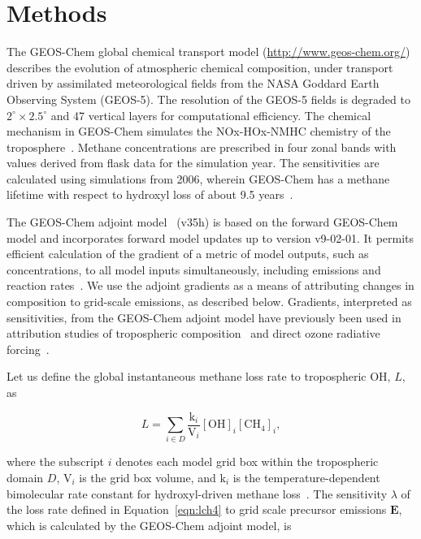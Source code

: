 \section{Methods}

The GEOS-Chem global chemical transport model (\url{http://www.geos-chem.org/}) describes the evolution of atmospheric chemical composition, under transport driven by assimilated meteorological fields from the NASA Goddard Earth Observing System (GEOS-5). The resolution of the GEOS-5 fields is degraded to $2^{\circ} \times 2.5^{\circ}$ and 47 vertical layers for computational efficiency. The chemical mechanism in GEOS-Chem simulates the NOx-HOx-NMHC chemistry of the troposphere~\citep{ref:mao2010}. Methane concentrations are prescribed in four zonal bands with values derived from flask data for the simulation year. The sensitivities are calculated using simulations from 2006, wherein GEOS-Chem has a methane lifetime with respect to hydroxyl loss of about 9.5 years~\citep{ref:holmes2013}.

The GEOS-Chem adjoint model~\cite{ref:henze2007} (v35h) is based on the forward GEOS-Chem model and incorporates forward model updates up to version v9-02-01. It permits efficient calculation of the gradient of a metric of model outputs, such as concentrations, to all model inputs simultaneously, including emissions and reaction rates~\cite{ref:paulot2012}. We use the adjoint gradients as a means of attributing changes in composition to grid-scale emissions, as described below. Gradients, interpreted as sensitivities, from the GEOS-Chem adjoint model have previously been used in attribution studies of tropospheric composition~\citep{ref:zhang2009,ref:walker2012} and direct ozone radiative forcing~\citep{ref:bowman2012}.

Let us define the global instantaneous methane loss rate to tropospheric OH, $L$, as

\begin{equation}
L=\sum_{i \in D} \frac{\mathrm{k}_i}{\mathrm{V}_i} \mathrm{[OH]}_i \mathrm{[CH_4]}_i,
\label{eqn:lch4}
\end{equation}

where the subscript $i$ denotes each model grid box within the tropospheric domain $D$, $\mathrm{V}_i$ is the grid box volume, and $\mathrm{k}_i$ is the temperature-dependent bimolecular rate constant for hydroxyl-driven methane loss~\citep{ref:sander2011}. The sensitivity $\lambda$ of the loss rate defined in Equation~\ref{eqn:lch4} to grid scale precursor emissions $\mathbf{E}$, which is calculated by the GEOS-Chem adjoint model, is

